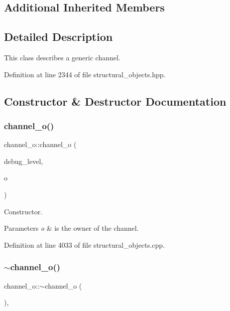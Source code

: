 \subsection*{Additional Inherited Members}


\subsection{Detailed Description}
This class describes a generic channel. 

Definition at line 2344 of file structural\+\_\+objects.\+hpp.



\subsection{Constructor \& Destructor Documentation}
\mbox{\label{classchannel__o_af663a17a3702a13f51ee81ef71debbe6}} 
\subsubsection{\texorpdfstring{channel\+\_\+o()}{channel\_o()}}
{\footnotesize\ttfamily channel\+\_\+o\+::channel\+\_\+o (\begin{DoxyParamCaption}\item[{int}]{debug\+\_\+level,  }\item[{const \hyperlink{structural__objects_8hpp_a8ea5f8cc50ab8f4c31e2751074ff60b2}{structural\+\_\+object\+Ref}}]{o }\end{DoxyParamCaption})}



Constructor. 


\begin{DoxyParams}{Parameters}
{\em o} & is the owner of the channel. \\
\hline
\end{DoxyParams}


Definition at line 4033 of file structural\+\_\+objects.\+cpp.

\mbox{\label{classchannel__o_a6a859c7d153f4778b052d8daaf5e1c77}} 
\subsubsection{\texorpdfstring{$\sim$channel\+\_\+o()}{~channel\_o()}}
{\footnotesize\ttfamily channel\+\_\+o\+::$\sim$channel\+\_\+o (\begin{DoxyParamCaption}{ }\end{DoxyParamCaption})\hspace{0.3cm}{\ttfamily [override]}, {\ttfamily [default]}}



